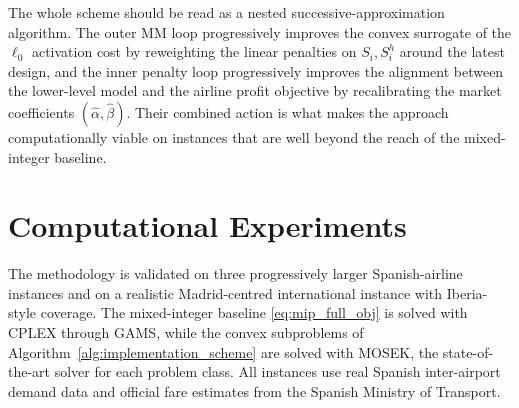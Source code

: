 \begin{algorithm}[t]
\caption{Penalty-based bilevel algorithm with outer sparsity updates}
\label{alg:implementation_scheme}
\end{algorithm}

The whole scheme should be read as a nested successive-approximation algorithm. The outer MM loop progressively improves the convex surrogate of the $\ell_0$ activation cost by reweighting the linear penalties on $S_i,S_i^h$ around the latest design, and the inner penalty loop progressively improves the alignment between the lower-level model and the airline profit objective by recalibrating the market coefficients $(\widehat{\alpha},\widehat{\beta})$. Their combined action is what makes the approach computationally viable on instances that are well beyond the reach of the mixed-integer baseline.

\section{Computational Experiments}
\label{sec:numerical_experiments}
The methodology is validated on three progressively larger Spanish-airline instances and on a realistic Madrid-centred international instance with Iberia-style coverage. The mixed-integer baseline \eqref{eq:mip_full_obj} is solved with CPLEX through GAMS, while the convex subproblems of Algorithm~\ref{alg:implementation_scheme} are solved with MOSEK, the state-of-the-art solver for each problem class. All instances use real Spanish inter-airport demand data and official fare estimates from the Spanish Ministry of Transport.

